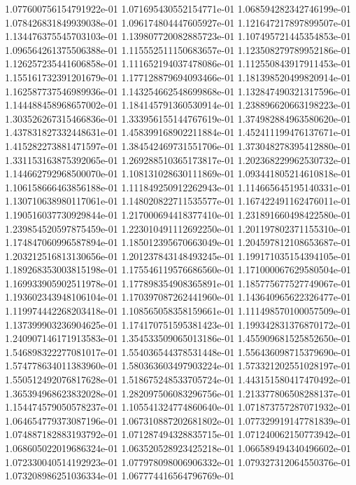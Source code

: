 1.077600756154791922e-01
1.071695430552154771e-01
1.068594282342746199e-01
1.078426831849939038e-01
1.096174804447605927e-01
1.121647217897899507e-01
1.134476375545703103e-01
1.139807720082885723e-01
1.107495721445354853e-01
1.096564261375506388e-01
1.115552511150683657e-01
1.123508279789952186e-01
1.126257235441606858e-01
1.111652194037478086e-01
1.112550843917911453e-01
1.155161732391201679e-01
1.177128879694093466e-01
1.181398520499820914e-01
1.162587737546989936e-01
1.143254662548699868e-01
1.132847490321317596e-01
1.144488458968657002e-01
1.184145791360530914e-01
1.238896620663198223e-01
1.303526267315466836e-01
1.333956155144767619e-01
1.374982884963580620e-01
1.437831827332448631e-01
1.458399168902211884e-01
1.452411199476137671e-01
1.415282273881471597e-01
1.384542469731551706e-01
1.373048278395412880e-01
1.331153163875392065e-01
1.269288510365173817e-01
1.202368229962530732e-01
1.144662792968500070e-01
1.108131028630111869e-01
1.093441805214610818e-01
1.106158666463856188e-01
1.111849250912262943e-01
1.114665645195140331e-01
1.130710638980117061e-01
1.148020822711535577e-01
1.167422491162476011e-01
1.190516037730929844e-01
1.217000694418377410e-01
1.231891660498422580e-01
1.239854520597875459e-01
1.223010491112692250e-01
1.201197802371155310e-01
1.174847060996587894e-01
1.185012395670663049e-01
1.204597812108653687e-01
1.203212516813130656e-01
1.201237843148493245e-01
1.199171035154394105e-01
1.189268353003815198e-01
1.175546119576686560e-01
1.171000067629580504e-01
1.169933905902511978e-01
1.177898354908365891e-01
1.185775677527749067e-01
1.193602343948106104e-01
1.170397087262441960e-01
1.143640965622326477e-01
1.119974442268203418e-01
1.108565058358159661e-01
1.111498570100057509e-01
1.137399903236904625e-01
1.174170751595381423e-01
1.199342831376870172e-01
1.240907146171913583e-01
1.354533509065013186e-01
1.455909681525852650e-01
1.546898322277081017e-01
1.554036544378531448e-01
1.556436098715379690e-01
1.574778634011383960e-01
1.580363603497903224e-01
1.573321202551028197e-01
1.550512492076817628e-01
1.518675248533705724e-01
1.443151580417470492e-01
1.365394968623832028e-01
1.282097506083296756e-01
1.213377806508288137e-01
1.154474579050578237e-01
1.105541324774860640e-01
1.071873757287071932e-01
1.064654779373087196e-01
1.067310887202681802e-01
1.077329919147781839e-01
1.074887182883193792e-01
1.071287494328835715e-01
1.071240062150773942e-01
1.068605022019686324e-01
1.063520528923425218e-01
1.066589494340496602e-01
1.072330040514192923e-01
1.077978098006906332e-01
1.079327312064550376e-01
1.073208986251036334e-01
1.067774416564796769e-01
